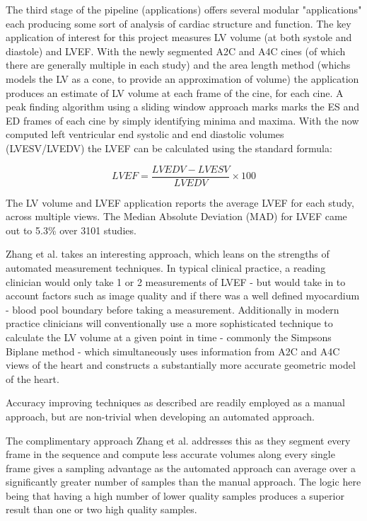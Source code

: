 The third stage of the pipeline (applications) offers several modular
"applications" each producing some sort of analysis of cardiac structure and
function. The key application of interest for this project measures LV volume
(at both systole and diastole) and LVEF. With the newly segmented A2C and A4C
cines (of which there are generally multiple in each study) and the area length
method (whichs models the LV as a cone, to provide an approximation of volume)
the application produces an estimate of LV volume at each frame of the cine, for
each cine. A peak finding algorithm using a sliding window approach marks marks
the ES and ED frames of each cine by simply identifying minima and maxima. With
the now computed left ventricular end systolic and end diastolic volumes
(LVESV/LVEDV) the LVEF can be calculated using the standard formula: \newline

\begin{equation}
        LVEF = \frac{LVEDV - LVESV}{LVEDV} \times 100
\end{equation} \newline

The LV volume and LVEF application reports the average LVEF for each study,
across multiple views. The Median Absolute Deviation (MAD) for LVEF came out to
5.3\% over 3101 studies. \newline

Zhang et al. takes an interesting approach, which leans on the strengths of automated
measurement techniques. In typical clinical practice, a reading clinician would
only take 1 or 2 measurements of LVEF - but would take in to account factors
such as image quality and if there was a well defined myocardium - blood pool
boundary before taking a measurement. Additionally in modern practice clinicians
will conventionally use a more sophisticated technique to calculate the LV
volume at a given point in time - commonly the Simpsons Biplane method - which
simultaneously uses information from A2C and A4C views of the heart and
constructs a substantially more accurate geometric model of the heart. \newline

Accuracy improving techniques as described are readily employed as a manual
approach, but are non-trivial when developing an automated approach. \newline

The complimentary approach Zhang et al. addresses this as they segment every
frame in the sequence and compute less accurate volumes along every single frame
gives a sampling advantage as the automated approach can average over a
significantly greater number of samples than the manual approach. The logic here
being that having a high number of lower quality samples produces a superior
result than one or two high quality samples. \newline

